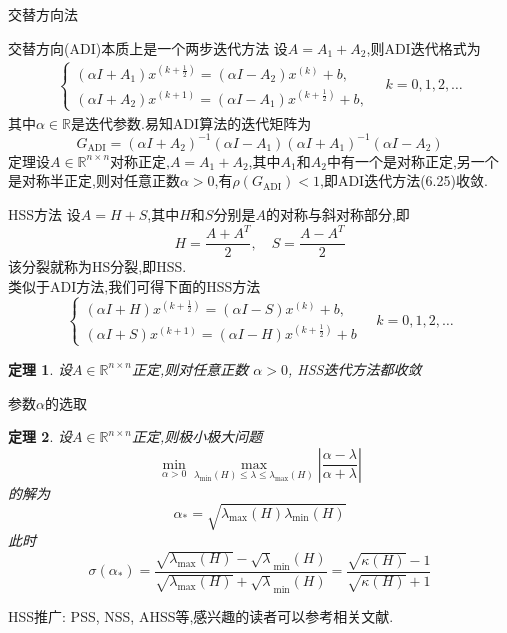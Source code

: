 \documentclass[notheorems,serif]{beamer}
\renewcommand{\normalsize}{\wuhao}
\newcommand{\wuhao}{\fontsize{10.5pt}{\baselineskip}\selectfont}
\newcommand{\hei}[1]{{\HEI#1}}
\newtheorem{theorem}{\hei{定理}}
\begin{document}
\begin{frame}
{交替方向法}

{\color{blue}交替方向(ADI)}本质上是一个两步迭代方法
设$A=A_{1}+A_{2}$,则ADI迭代格式为
\begin{align*}
\left\{\begin{array}{l}{\left(\alpha I+A_{1}\right) x^{\left(k+\frac{1}{2}\right)}=\left(\alpha I-A_{2}\right) x^{(k)}+b,} \\ {\left(\alpha I+A_{2}\right) x^{(k+1)}=\left(\alpha I-A_{1}\right) x^{\left(k+\frac{1}{2}\right)}+b,}\end{array} \quad k=0,1,2, \ldots\right.
\tag{6.25}
\end{align*}
其中$\alpha \in \mathbb{R}$是迭代参数.易知ADI算法的迭代矩阵为
$$
G_{\mathrm{ADI}}=\left(\alpha I+A_{2}\right)^{-1}\left(\alpha I-A_{1}\right)\left(\alpha I+A_{1}\right)^{-1}\left(\alpha I-A_{2}\right)
$$
{\color{blue}定理}\qquad 设$A \in \mathbb{R}^{n \times n}$对称正定,$A=A_{1}+A_{2}$,其中$A_1$和$A_2$中有一个是对称正定,另一个是对称半正定,则对任意正数$\alpha>0$,有$\rho\left(G_{\mathrm{ADI}}\right)<1$,即ADI迭代方法(6.25)收敛.\\
\end{frame}

\begin{frame}
{HSS方法}
设$A=H+S$,其中$H$和$S$分别是$A$的对称与斜对称部分,即
$$
H=\frac{A+A^{T}}{2}, \quad S=\frac{A-A^{T}}{2}
$$
该分裂就称为HS分裂,即HSS.\\
类似于ADI方法,我们可得下面的HSS方法\\
$$
\left\{\begin{array}{l}{(\alpha I+H) x^{\left(k+\frac{1}{2}\right)}=(\alpha I-S) x^{(k)}+b,} \\ {(\alpha I+S) x^{(k+1)}=(\alpha I-H) x^{\left(k+\frac{1}{2}\right)}+b}\end{array} \quad k=0,1,2, \ldots\right.
$$
\begin{theorem}
设$A \in \mathbb{R}^{n \times n}$正定,则对任意正数  $\alpha>0$, HSS迭代方法都收敛\\
\end{theorem}
\end{frame}


\begin{frame}


{\color{blue}\Large 参数$\alpha$的选取}

\quad

\normalsize
\begin{theorem}
\qquad 设$A \in \mathbb{R}^{n \times n}$正定,则极小极大问题
$$
\min _{\alpha>0} \max _{\lambda_{\min }(H) \leq \lambda \leq \lambda_{\max }(H)}\left|\frac{\alpha-\lambda}{\alpha+\lambda}\right|
$$
的解为
$$
\alpha_{*}=\sqrt{\lambda_{\max }(H) \lambda_{\min }(H)}
$$
此时
$$
\sigma\left(\alpha_{*}\right)=\frac{\sqrt{\lambda_{\max }(H)}-\sqrt{\lambda}_{\min }(H)}{\sqrt{\lambda_{\max }(H)}+\sqrt{\lambda}_{\min }(H)}=\frac{\sqrt{\kappa(H)}-1}{\sqrt{\kappa(H)}+1}
$$
\end{theorem}
HSS推广: PSS, NSS, AHSS等,感兴趣的读者可以参考相关文献.\\
\end{frame}
\end{document}
